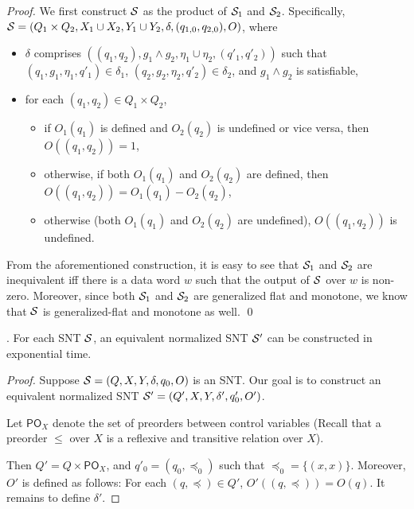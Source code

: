 \begin{appendix}
\begin{proof}
We first construct ${\mathcal{S} }$ as the product of ${\mathcal{S} }_1$ and ${\mathcal{S} }_2$. Specifically, ${\mathcal{S} }=(Q_1 \times Q_2, X_1 \cup X_2, Y_1 \cup Y_2, \delta, (q_{1,0},q_{2,0}), O)$, where
\begin{itemize}
\item $\delta$ comprises $((q_1,q_2), g_1 \wedge g_2, \eta_1 \cup \eta_2, (q'_1,q'_2))$ such that $(q_1,g_1,\eta_1,q'_1) \in \delta_1$, $(q_2,g_2,\eta_2,q'_2) \in \delta_2$, and $g_1 \wedge g_2$ is satisfiable,
%
\item for each $(q_1,q_2) \in Q_1 \times Q_2$, 
\begin{itemize}
\item if $O_1(q_1)$ is defined and $O_2(q_2)$ is undefined or vice versa, then $O((q_1,q_2))=1$, 
%
\item otherwise, if both $O_1(q_1)$ and $O_2(q_2)$ are defined, then $O((q_1,q_2))=O_1(q_1) - O_2(q_2)$, 
%
\item otherwise (both $O_1(q_1)$ and $O_2(q_2)$ are undefined), $O((q_1,q_2))$ is undefined. 
\end{itemize}
\end{itemize}
From the aforementioned construction, it is easy to see that ${\mathcal{S} }_1$ and ${\mathcal{S} }_2$ are  inequivalent iff there is a data word $w$ such that the output of ${\mathcal{S} }$ over $w$ is non-zero. Moreover, since both ${\mathcal{S} }_1$ and ${\mathcal{S} }_2$ are generalized flat and monotone, we know that ${\mathcal{S} }$ is generalized-flat and monotone as well.   \qed
\end{proof}

.
{
For each SNT ${\mathcal{S} }$, an equivalent normalized SNT ${\mathcal{S} }'$ can be constructed in exponential time.
}
\smallskip

\newcommand{\po}{\mathsf{PO}}


\begin{proof}
Suppose ${\mathcal{S} } = (Q, X, Y, \delta, q_0, O)$ is an SNT. Our goal is to construct an equivalent normalized SNT ${\mathcal{S} }'=(Q', X, Y, \delta', q'_0, O')$.

Let $\po_{X}$ denote the set of preorders between control variables (Recall that a preorder $\le$ over $X$ is a reflexive and transitive relation over $X$). 

Then $Q'= Q \times \po_X$, and $q'_0=(q_0, \preceq_0)$ such that $\preceq_0 = \{(x,x)\}$. Moreover, $O'$ is defined as follows: For each $(q, \preceq) \in Q'$, $O'((q, \preceq))=O(q)$. It remains to define $\delta'$.


\end{proof}
\end{appendix}
